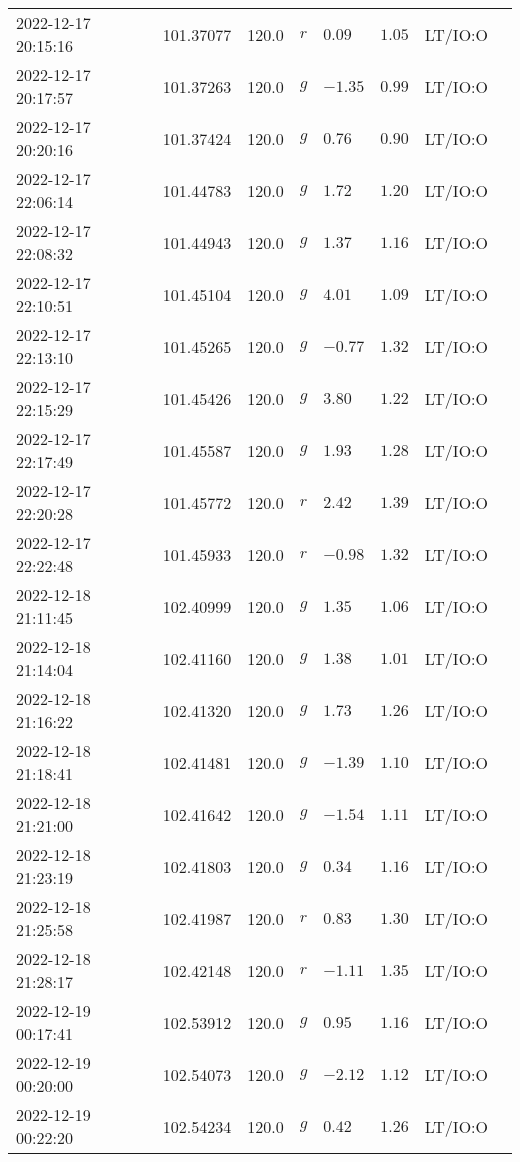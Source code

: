 \documentclass{nature_plusfigure}
\begin{document}
\begin{supplement}
\begin{center}
\begin{longtable}{llllllll}
2022-12-17 20:15:16 & 101.37077 & 120.0 & $r$ & $0.09$ & $1.05$ & LT/IO:O &  \\ 
2022-12-17 20:17:57 & 101.37263 & 120.0 & $g$ & $-1.35$ & $0.99$ & LT/IO:O &  \\ 
2022-12-17 20:20:16 & 101.37424 & 120.0 & $g$ & $0.76$ & $0.90$ & LT/IO:O &  \\ 
2022-12-17 22:06:14 & 101.44783 & 120.0 & $g$ & $1.72$ & $1.20$ & LT/IO:O &  \\ 
2022-12-17 22:08:32 & 101.44943 & 120.0 & $g$ & $1.37$ & $1.16$ & LT/IO:O &  \\ 
2022-12-17 22:10:51 & 101.45104 & 120.0 & $g$ & $4.01$ & $1.09$ & LT/IO:O &  \\ 
2022-12-17 22:13:10 & 101.45265 & 120.0 & $g$ & $-0.77$ & $1.32$ & LT/IO:O &  \\ 
2022-12-17 22:15:29 & 101.45426 & 120.0 & $g$ & $3.80$ & $1.22$ & LT/IO:O &  \\ 
2022-12-17 22:17:49 & 101.45587 & 120.0 & $g$ & $1.93$ & $1.28$ & LT/IO:O &  \\ 
2022-12-17 22:20:28 & 101.45772 & 120.0 & $r$ & $2.42$ & $1.39$ & LT/IO:O &  \\ 
2022-12-17 22:22:48 & 101.45933 & 120.0 & $r$ & $-0.98$ & $1.32$ & LT/IO:O &  \\ 
2022-12-18 21:11:45 & 102.40999 & 120.0 & $g$ & $1.35$ & $1.06$ & LT/IO:O &  \\ 
2022-12-18 21:14:04 & 102.41160 & 120.0 & $g$ & $1.38$ & $1.01$ & LT/IO:O &  \\ 
2022-12-18 21:16:22 & 102.41320 & 120.0 & $g$ & $1.73$ & $1.26$ & LT/IO:O &  \\ 
2022-12-18 21:18:41 & 102.41481 & 120.0 & $g$ & $-1.39$ & $1.10$ & LT/IO:O &  \\ 
2022-12-18 21:21:00 & 102.41642 & 120.0 & $g$ & $-1.54$ & $1.11$ & LT/IO:O &  \\ 
2022-12-18 21:23:19 & 102.41803 & 120.0 & $g$ & $0.34$ & $1.16$ & LT/IO:O &  \\ 
2022-12-18 21:25:58 & 102.41987 & 120.0 & $r$ & $0.83$ & $1.30$ & LT/IO:O &  \\ 
2022-12-18 21:28:17 & 102.42148 & 120.0 & $r$ & $-1.11$ & $1.35$ & LT/IO:O &  \\ 
2022-12-19 00:17:41 & 102.53912 & 120.0 & $g$ & $0.95$ & $1.16$ & LT/IO:O &  \\ 
2022-12-19 00:20:00 & 102.54073 & 120.0 & $g$ & $-2.12$ & $1.12$ & LT/IO:O &  \\ 
2022-12-19 00:22:20 & 102.54234 & 120.0 & $g$ & $0.42$ & $1.26$ & LT/IO:O &  \\ 

\end{longtable}
\end{center}
\end{supplement}
\end{document}
